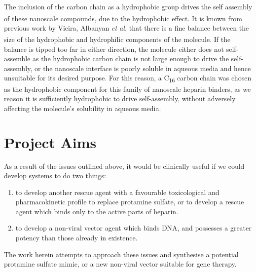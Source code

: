 The inclusion of the carbon chain as a hydrophobic group drives the self assembly of these nanoscale compounds, due to the hydrophobic effect.\textsuperscript{\cite{Rodrigo2011Self-AssemblingBinding}} It is known from previous work by Vieira, Albanyan \textit{et al.} that there is a fine balance between the size of the hydrophobic and hydrophilic components of the molecule.\textsuperscript{\cite{Vieira2017EmergenceHeparin}}
If the balance is tipped too far in either direction, the molecule either does not self-assemble as the hydrophobic carbon chain is not large enough to drive the self-assembly, or the nanoscale interface is poorly soluble in aqueous media and hence unsuitable for its desired purpose. For this reason, a C\textsubscript{16} carbon chain was chosen as the hydrophobic component for this family of nanoscale heparin binders, as we reason it is sufficiently hydrophobic to drive self-assembly, without adversely affecting the molecule's solubility in aqueous media. 
\newpage
\section{Project Aims}
As a result of the issues outlined above, it would be clinically useful if we could develop systems to do two things: 
\begin{enumerate}
\item to develop another rescue agent with a favourable toxicological and pharmacokinetic profile to replace protamine sulfate, or to develop a rescue agent which binds only to the active parts of heparin. 
\item to develop a non-viral vector agent which binds DNA, and possesses a greater potency than those already in existence. 
\end{enumerate}
The work herein attempts to approach these issues and synthesise a potential protamine sulfate mimic, or a new non-viral vector suitable for gene therapy.

